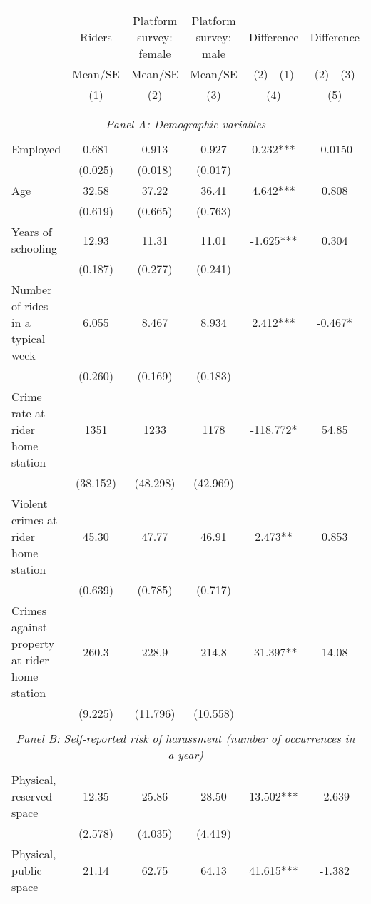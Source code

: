 


\begin{tabular}{lccccc} \hline\hline \\[-1.8ex]
 & Riders & Platform survey: female & Platform survey: male & Difference & Difference \\
 & Mean/SE & Mean/SE & Mean/SE & (2) - (1) & (2) - (3) \\
 & (1) & (2) & (3) & (4) & (5) \\ \hline \\[-1.8ex] \\[-1ex] \multicolumn{6}{c}{\textit{Panel A: Demographic variables}} \\[-1ex] \\
Employed & 0.681 & 0.913 & 0.927 & 0.232*** & -0.0150 \\
 & (0.025) & (0.018) & (0.017) &  &  \\
Age & 32.58 & 37.22 & 36.41 & 4.642*** & 0.808 \\
 & (0.619) & (0.665) & (0.763) &  &  \\
Years of schooling & 12.93 & 11.31 & 11.01 & -1.625*** & 0.304 \\
 & (0.187) & (0.277) & (0.241) &  &  \\
Number of rides in a typical week & 6.055 & 8.467 & 8.934 & 2.412*** & -0.467* \\
 & (0.260) & (0.169) & (0.183) &  &  \\
Crime rate at rider home station & 1351 & 1233 & 1178 & -118.772* & 54.85 \\
 & (38.152) & (48.298) & (42.969) &  &  \\
Violent crimes at rider home station & 45.30 & 47.77 & 46.91 & 2.473** & 0.853 \\
 & (0.639) & (0.785) & (0.717) &  &  \\
Crimes against property at rider home station & 260.3 & 228.9 & 214.8 & -31.397** & 14.08 \\
 & (9.225) & (11.796) & (10.558) &  &  \\
\\[-1ex] \multicolumn{6}{c}{\textit{Panel B: Self-reported risk of harassment (number of occurrences in a year)}} \\ \\[-1ex] Physical, reserved space & 12.35 & 25.86 & 28.50 & 13.502*** & -2.639 \\
 & (2.578) & (4.035) & (4.419) &  &  \\
Physical, public space & 21.14 & 62.75 & 64.13 & 41.615*** & -1.382 \\

\end{tabular}
